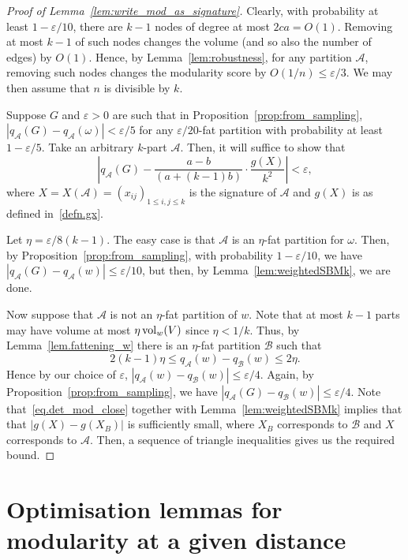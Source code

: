 \documentclass[a4paper,UKenglish,cleveref, autoref, thm-restate,numberwithinsect]{lipics-v2021}
\newcommand{\cA}{\mathcal{A}}
\newcommand{\cB}{\mathcal{B}}
\newcommand{\eps}{\varepsilon}
\newcommand{\vol}{{\rm vol}}
\begin{document}
\begin{proof}[Proof of Lemma~\ref{lem:write_mod_as_signature}]
Clearly, with probability at least $1-\eps/10$, there are $k-1$ nodes of degree at most $2ca = O(1)$. Removing at most $k-1$ of such nodes changes the volume (and so also the number of edges) by $O(1)$. Hence, by Lemma~\ref{lem:robustness}, for any partition $\cA$, removing such nodes changes the modularity score by $O(1/n) \le \eps/3$. 
We may then assume that $n$ is divisible by $k$. 

Suppose $G$ and $\eps>0$ are such that in Proposition~\ref{prop:from_sampling}, $|q_\cA(G)-q_\cA(\omega)|<\eps/5$ for any $\eps/20$-fat partition with probability at least $1-\eps/5$.
Take an arbitrary $k$-part $\cA$. Then, it will suffice to show that 
\[ 
\left| q_\cA(G) - \frac{a-b}{(a+(k-1)b)} \cdot \frac {g(X)}{k^2} \right| < \eps, 
\]
where $X = X(\cA) =(x_{ij})_{1\leq i,j \leq k}$ is the signature of $\cA$ and $g(X)$ is as defined in~\eqref{defn.gx}.



Let $\eta=\eps/8(k-1)$. The easy case is that $\cA$ is an $\eta$-fat partition for $\omega$. Then, by Proposition~\ref{prop:from_sampling}, with probability $1-\eps/10$, we have $|q_\cA(G)-q_\cA(w)|\leq \eps/10$, but then, by Lemma~\ref{lem:weightedSBMk}, we are done.

Now suppose that $\cA$ is not an $\eta$-fat partition of $w$. 
%
%
Note that at most $k-1$ parts may have volume at most $\eta \, \vol_w(V)$ since $\eta<1/k$. Thus, by Lemma~\ref{lem.fattening_w} there is an $\eta$-fat partition $\cB$ such that
\begin{equation}\label{eq.det_mod_close}  
2(k-1)\eta \leq q_\cA(w) - q_{\cB}(w) \leq 2\eta. 
\end{equation}
%
%
Hence by our choice of $\eps$, $|q_\cA(w) - q_{\cB}(w)|\leq \eps/4$.
Again, by Proposition~\ref{prop:from_sampling}, we have $|q_{\cA}(G) - q_{\cB}(w)|\leq \eps/4$. 
Note that~\eqref{eq.det_mod_close} together with Lemma~\ref{lem:weightedSBMk} implies that that $|g(X)-g(X_B)|$ is sufficiently small, where $X_B$ corresponds to $\cB$ and $X$ corresponds to $\cA$. Then, a sequence of triangle inequalities gives us the required bound.
\end{proof}



\section{Optimisation lemmas for modularity at a given distance}
\label{app:optimisation}
\end{document}
